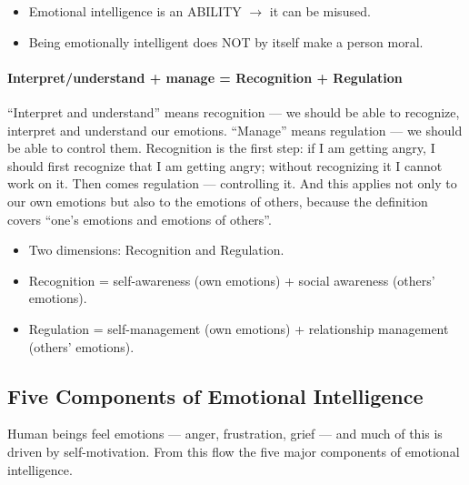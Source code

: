 \begin{CriticalPoint}
\begin{itemize}
\item Emotional intelligence is an ABILITY $\rightarrow$ it can be misused.
\item Being emotionally intelligent does NOT by itself make a person moral.
\end{itemize}
\end{CriticalPoint}

\paragraph{Interpret/understand + manage = Recognition + Regulation} ``Interpret and understand'' means recognition --- we should be able to recognize, interpret and understand our emotions. ``Manage'' means regulation --- we should be able to control them. Recognition is the first step: if I am getting angry, I should first recognize that I am getting angry; without recognizing it I cannot work on it. Then comes regulation --- controlling it. And this applies not only to our own emotions but also to the emotions of others, because the definition covers ``one's emotions and emotions of others''.

\begin{KeyConcept}
\begin{itemize}
\item Two dimensions: Recognition and Regulation.
\item Recognition = self-awareness (own emotions) + social awareness (others' emotions).
\item Regulation = self-management (own emotions) + relationship management (others' emotions).
\end{itemize}
\end{KeyConcept}

\subsection{Five Components of Emotional Intelligence}

Human beings feel emotions --- anger, frustration, grief --- and much of this is driven by self-motivation. From this flow the five major components of emotional intelligence.

